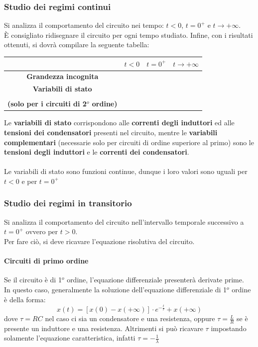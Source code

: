 \documentclass[../main.tex]{subfiles}
\begin{document}
	\subsubsection{Studio dei regimi continui}
	Si analizza il comportamento del circuito nei tempo: $t<0$, $t=0^+$ e $t \to +\infty$.\\
	È consigliato ridisegnare il circuito per ogni tempo studiato.
	Infine, con i risultati ottenuti, si dovrà compilare la seguente tabella:
	\begin{center}
		\begin{tabular}{|c|c|c|c|}
			\hline
			& $t < 0$ & $t=0^+$ & $t \to +\infty$\\
			\hline
			\textbf{Grandezza incognita} & & & \\
			\hline
			\textbf{Variabili di stato} & & & \\
			\hline
			\thead{\textbf{Variabili complementari} \\ \textbf{(solo per i circuiti di 2$^o$ ordine)}} & & & \\
			\hline
		\end{tabular}
	\end{center}
	Le \textbf{variabili di stato} corrispondono alle \textbf{correnti degli induttori} ed alle \textbf{tensioni dei condensatori} presenti nel circuito, mentre le \textbf{variabili complementari} (necessarie solo per circuiti di ordine superiore al primo) sono le \textbf{tensioni degli induttori }e le \textbf{correnti dei condensatori}.\\\\
	 Le variabili di stato sono funzioni continue, dunque i loro valori sono uguali per $t<0$ e per $t=0^+$
	\subsubsection{Studio dei regimi in transitorio}
	Si analizza il comportamento del circuito nell’intervallo temporale successivo a $t=0^+$ ovvero per $t>0$.\\
	Per fare ciò, si deve ricavare l’equazione risolutiva del circuito.\\
	\paragraph{Circuiti di primo ordine}
	Se il circuito è di 1$^o$ ordine, l’equazione differenziale presenterà derivate prime.\\
	In questo caso, generalmente la soluzione dell’equazione differenziale di 1$^o$ ordine è della forma:
	\begin{equation}
		x(t) = \left[ x(0) - x(+\infty) \right] \cdot e^{-\frac{t}{\tau}} + x(+\infty)
	\end{equation}
	dove $\tau = RC$ nel caso ci sia un condensatore e una resistenza, oppure $\tau = \frac{L}{R}$ se è presente un induttore e una resistenza.
	Altrimenti si può ricavare $\tau$ impostando solamente l’equazione caratteristica, infatti $\tau = - \frac{1}{\lambda}$
\end{document}
